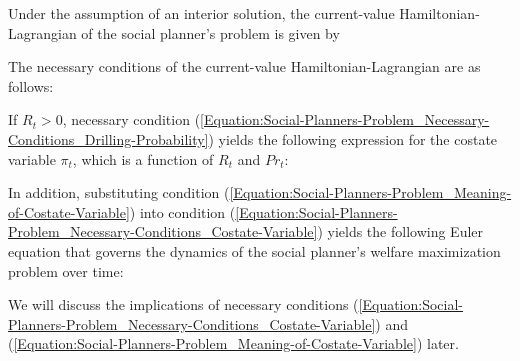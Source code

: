 Under the assumption of an interior solution, the current-value Hamiltonian-Lagrangian of the social planner's problem is given by


The necessary conditions of the current-value Hamiltonian-Lagrangian are as follows:

If $R_{t} > 0$, necessary condition (\ref{Equation:Social-Planners-Problem_Necessary-Conditions_Drilling-Probability}) yields the following expression for the costate variable $\pi_{t}$, which is a function of $R_{t}$ and $Pr_{t}$:

In addition, substituting condition (\ref{Equation:Social-Planners-Problem_Meaning-of-Costate-Variable}) into condition (\ref{Equation:Social-Planners-Problem_Necessary-Conditions_Costate-Variable}) yields the following Euler equation that governs the dynamics of the social planner's welfare maximization problem over time:

We will discuss the implications of necessary conditions (\ref{Equation:Social-Planners-Problem_Necessary-Conditions_Costate-Variable}) and (\ref{Equation:Social-Planners-Problem_Meaning-of-Costate-Variable}) later. 

